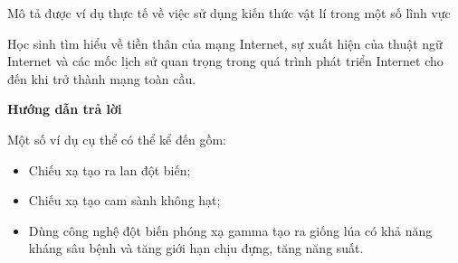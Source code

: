 \begin{dang}{Mô tả được ví dụ thực tế về việc sử dụng kiến thức vật lí trong một số lĩnh vực}
{		Học sinh tìm hiểu về tiền thân của mạng Internet, sự xuất hiện của thuật ngữ Internet và các mốc lịch sử quan trọng trong quá trình phát triển Internet cho đến khi trở thành mạng toàn cầu.
		
	}
	{	\begin{center}
			\textbf{Hướng dẫn trả lời}
		\end{center}
		
		Một số ví dụ cụ thể có thể kể đến gồm:
		\begin{itemize}
			\item Chiếu xạ tạo ra lan đột biến;
			\item Chiếu xạ tạo cam sành không hạt;
			\item Dùng công nghệ đột biến phóng xạ gamma tạo ra giống lúa có khả năng kháng sâu bệnh và tăng giới hạn chịu đựng, tăng năng suất.
		\end{itemize}
	}
\end{dang}
